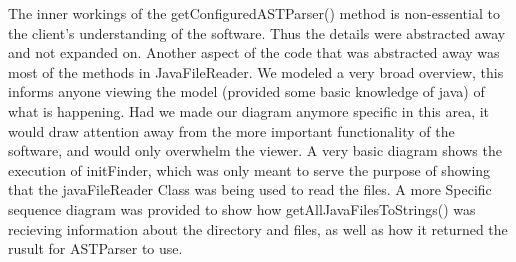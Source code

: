 \documentclass[12p]{article}
\begin{document}
The inner workings of the getConfiguredASTParser() method is non-essential to the client's understanding of the software. Thus the details were abstracted away and not expanded on. Another aspect of the code that was abstracted away was most of the methods in JavaFileReader. We modeled a very broad overview, this informs anyone viewing the model (provided some basic knowledge of java) of what is happening. Had we made our diagram anymore specific in this area, it would draw attention away from the more important functionality of the software, and would only overwhelm the viewer. A very basic diagram shows the execution of initFinder, which was only meant to serve the purpose of showing that the javaFileReader Class was being used to read the files. A more Specific sequence diagram was provided to show how getAllJavaFilesToStrings() was recieving information about the directory and files, as well as how it returned the rusult for ASTParser to use.
\end{document}
